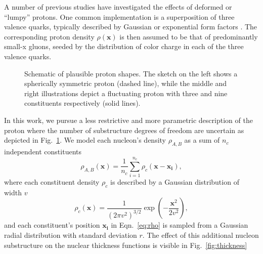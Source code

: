 \documentclass[aps,prc,reprint,amsmath,nofootinbib]{revtex4-1}
\newcommand{\x}{\mathbf x}
\begin{document}
A number of previous studies have investigated the effects of deformed or ``lumpy'' protons.
One common implementation is a superposition of three valence quarks, typically described by Gaussian or exponential form factors \cite{Welsh:2016siu, Bozek:2017jog, Schenke:2014zha, Schlichting:2014ipa, Adare:2015bua, Broniowski:2016pvx}.
The corresponding proton density $\rho(\mathbf{x})$ is then assumed to be that of predominantly small-x gluons, seeded by the distribution of color charge in each of the three valence quarks.

\begin{figure}
  \caption{Schematic of plausible proton shapes. The sketch on the left shows a spherically symmetric proton (dashed line), while the middle and right illustrations depict a fluctuating proton with three and nine constituents respectively (solid lines).}
  \label{fig:substructure}
\end{figure}

In this work, we pursue a less restrictive and more parametric description of the proton where the number of substructure degrees of freedom are uncertain as depicted in Fig.~\ref{fig:substructure}.
We model each nucleon's density $\rho_{A,B}$ as a sum of $n_c$ independent constituents
\begin{equation}
  \label{eq:rho}
  \rho_{A, B}(\x) = \frac{1}{n_c} \sum\limits_{i=1}^{n_c} \rho_c(\mathbf{x} - \mathbf{x_i}),
\end{equation}
where each constituent density $\rho_c$ is described by a Gaussian distribution of width $v$
\begin{equation}
  \label{eq:constituent_density}
  \rho_c(\mathbf{x}) = \frac{1}{(2\pi v^2)^{3/2}} \exp\left(-\frac{\x^2}{2 v^2}\right),
\end{equation}
and each constituent's position $\mathbf{x_i}$ in Eqn.~\eqref{eq:rho} is sampled from a Gaussian radial distribution with standard deviation $r$.
The effect of this additional nucleon substructure on the nuclear thickness functions is visible in Fig.~\ref{fig:thickness}
\end{document}
